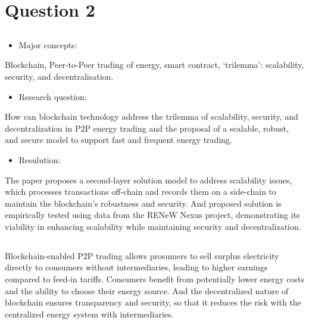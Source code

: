 \documentclass[UTF8,a4paper,AutoFakeBold,AutoFakeSlant]{article}
\begin{document}
\section{Question 2}

\subsection{}

\begin{itemize}
    \item Major concepts:
\end{itemize}
Blockchain, Peer-to-Peer trading of energy, smart contract, ‘trilemma’: scalability, security, and decentralisation.

\begin{itemize}
    \item Research question:
\end{itemize}

How can blockchain technology address the trilemma of scalability, security, and decentralization in P2P energy trading
and the proposal of a scalable, robust, and secure model to support fast and frequent energy trading.

\begin{itemize}
    \item Resulution:
\end{itemize}

The paper proposes a second-layer solution model to address scalability issues, which processes transactions off-chain and records them on a side-chain to maintain the blockchain's robustness and security.
And proposed solution is empirically tested using data from the RENeW Nexus project, demonstrating its viability in enhancing scalability while maintaining security and decentralization.


\subsection{}

Blockchain-enabled P2P trading allows prosumers to sell surplus electricity directly to consumers without intermediaries, leading to higher earnings compared to feed-in tariffs.
Consumers benefit from potentially lower energy costs and the ability to choose their energy source.
And the decentralized nature of blockchain ensures transparency and security,
so that it reduces the risk with the centralized energy system with intermediaries.
\end{document}
